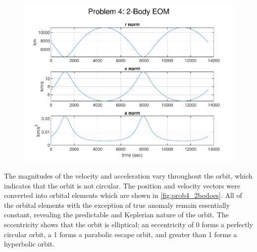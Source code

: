\documentclass[conf]{new-aiaa}
\begin{document}
\begin{figure}[H]
	\centering
	\includegraphics{prob4_2bodeom.pdf}
	\caption{}
	\label{fig:prob4_2bodeom}
\end{figure}

The magnitudes of the velocity and acceleration vary throughout the orbit, which indicates that the orbit is not circular. The position and velocity vectors were converted into orbital elements which are shown in \ref{fig:prob4_2bodoes}. All of the orbital elements with the exception of true anomaly remain essentially constant, revealing the predictable and Keplerian nature of the orbit. The eccentricity shows that the orbit is elliptical; an eccentricity of 0 forms a perfectly circular orbit, a 1 forms a parabolic escape orbit, and greater than 1 forms a hyperbolic orbit. 
\end{document}

